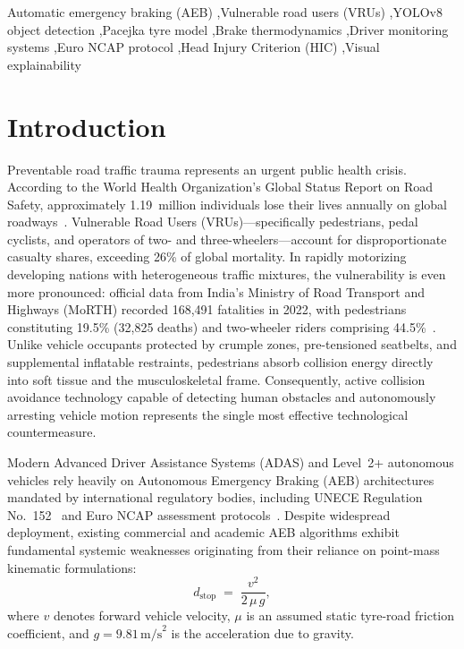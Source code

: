 \documentclass[3p,twocolumn]{elsarticle}
\begin{document}
\begin{frontmatter}
\begin{abstract}
recorder. This paper provides an open, fully verifiable benchmark establishing that physics-grounded perception-control coupling is both technically feasible and essential for resilient autonomous vehicle safety.
\end{abstract}

\begin{keyword}
Automatic emergency braking (AEB) \sep Vulnerable road users (VRUs) \sep YOLOv8 object detection \sep Pacejka tyre model \sep Brake thermodynamics \sep Driver monitoring systems \sep Euro NCAP protocol \sep Head Injury Criterion (HIC) \sep Visual explainability
\end{keyword}

\end{frontmatter}

\section{Introduction}
\label{sec:intro}

Preventable road traffic trauma represents an urgent public health crisis. According to the World Health Organization's Global Status Report on Road Safety, approximately 1.19~million individuals lose their lives annually on global roadways~\cite{who2023}. Vulnerable Road Users (VRUs)---specifically pedestrians, pedal cyclists, and operators of two- and three-wheelers---account for disproportionate casualty shares, exceeding 26\% of global mortality. In rapidly motorizing developing nations with heterogeneous traffic mixtures, the vulnerability is even more pronounced: official data from India's Ministry of Road Transport and Highways (MoRTH) recorded 168,491 fatalities in 2022, with pedestrians constituting 19.5\% (32,825 deaths) and two-wheeler riders comprising 44.5\%~\cite{morth2023}. Unlike vehicle occupants protected by crumple zones, pre-tensioned seatbelts, and supplemental inflatable restraints, pedestrians absorb collision energy directly into soft tissue and the musculoskeletal frame. Consequently, active collision avoidance technology capable of detecting human obstacles and autonomously arresting vehicle motion represents the single most effective technological countermeasure.

Modern Advanced Driver Assistance Systems (ADAS) and Level~2+ autonomous vehicles rely heavily on Autonomous Emergency Braking (AEB) architectures mandated by international regulatory bodies, including UNECE Regulation No.~152~\cite{unece2020} and Euro NCAP assessment protocols~\cite{euroncap2023}. Despite widespread deployment, existing commercial and academic AEB algorithms exhibit fundamental systemic weaknesses originating from their reliance on point-mass kinematic formulations:
\begin{equation}
  d_{\text{stop}} \;=\; \frac{v^2}{2\,\mu\,g},
  \label{eq:kinematic}
\end{equation}
where $v$ denotes forward vehicle velocity, $\mu$ is an assumed static tyre-road friction coefficient, and $g = 9.81\,\text{m/s}^2$ is the acceleration due to gravity. 
\end{document}
